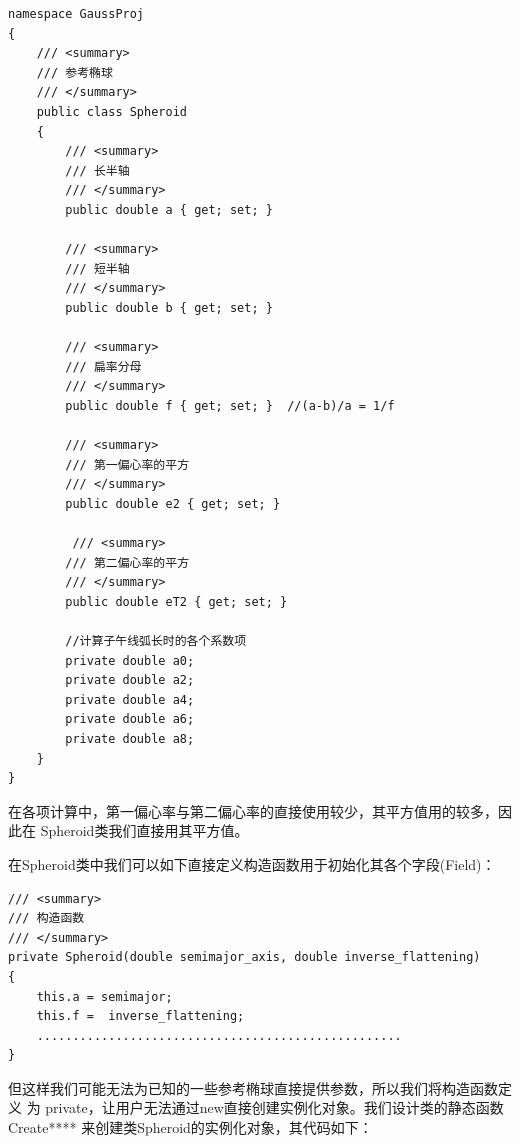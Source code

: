 \begin{lstlisting}
namespace GaussProj
{
    /// <summary>
    /// 参考椭球
    /// </summary>
    public class Spheroid
    {
        /// <summary>
        /// 长半轴
        /// </summary>
        public double a { get; set; }

        /// <summary>
        /// 短半轴
        /// </summary>
        public double b { get; set; }

        /// <summary>
        /// 扁率分母
        /// </summary>
        public double f { get; set; }  //(a-b)/a = 1/f

        /// <summary>
        /// 第一偏心率的平方
        /// </summary>
        public double e2 { get; set; }

         /// <summary>
        /// 第二偏心率的平方
        /// </summary>
        public double eT2 { get; set; }

        //计算子午线弧长时的各个系数项
        private double a0;
        private double a2;
        private double a4;
        private double a6;
        private double a8;
    }
}
\end{lstlisting}

在各项计算中，第一偏心率与第二偏心率的直接使用较少，其平方值用的较多，因此在
Spheroid类我们直接用其平方值。

在Spheroid类中我们可以如下直接定义构造函数用于初始化其各个字段(Field)：
\begin{lstlisting}
/// <summary>
/// 构造函数
/// </summary>
private Spheroid(double semimajor_axis, double inverse_flattening)
{
    this.a = semimajor;
    this.f =  inverse_flattening;
    ...................................................
}
\end{lstlisting}

但这样我们可能无法为已知的一些参考椭球直接提供参数，所以我们将构造函数定义
为 private，让用户无法通过new直接创建实例化对象。我们设计类的静态函数
Create**** 来创建类Spheroid的实例化对象，其代码如下：

